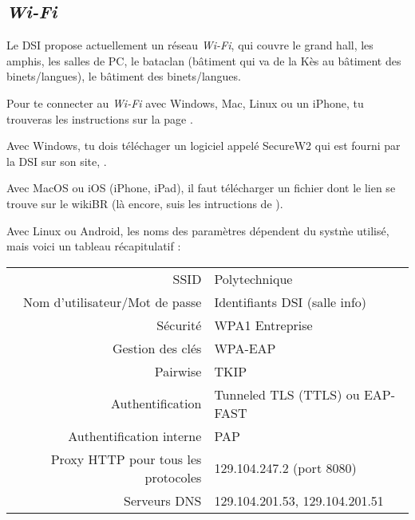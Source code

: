 \subsection{\emph{Wi-Fi}}
\label{wifi} 
Le DSI propose actuellement un réseau \emph{Wi-Fi}, qui couvre le grand hall, les amphis, les salles de PC, le bataclan (bâtiment qui va de la Kès au bâtiment des
binets/langues), le bâtiment des binets/langues.

Pour te connecter au \emph{Wi-Fi} avec Windows, Mac, Linux ou un iPhone, tu trouveras les instructions sur la page .

Avec Windows, tu dois t\'el\'echager un logiciel appel\'e SecureW2 qui est fourni par la DSI sur son site, .

Avec MacOS ou iOS (iPhone, iPad), il faut t\'el\'echarger un fichier  dont le lien se trouve sur le wikiBR (l\`a encore, suis les intructions de ).

Avec Linux ou Android, les noms des param\`etres d\'ependent du syst\`me utilis\'e, mais voici un tableau r\'ecapitulatif :
\begin{center}
\begin{tabular}{|r|l|}
 SSID & Polytechnique \\
 Nom d'utilisateur/Mot de passe & Identifiants DSI (salle info) \\
 S\'ecurit\'e & WPA1 Entreprise \\
 Gestion des cl\'es & WPA-EAP \\
 Pairwise & TKIP \\
 Authentification & Tunneled TLS (TTLS) ou EAP-FAST \\
 Authentification interne & PAP \\
 Proxy HTTP pour tous les protocoles & 129.104.247.2 (port 8080) \\
 Serveurs DNS & 129.104.201.53, 129.104.201.51
\end{tabular}
\end{center}






